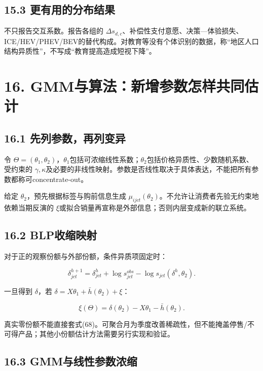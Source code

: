 \documentclass[
  11pt,
]{article}
\begin{document}
\subsection{15.3
更有用的分布结果}\label{ux66f4ux6709ux7528ux7684ux5206ux5e03ux7ed3ux679c}

不只报告交互系数。报告各组的
\(\Delta s_{d,c}\)、补偿性支付意愿、决策---体验损失、ICE/HEV/PHEV/BEV的替代构成。对教育等没有个体识别的数据，称``地区人口结构异质性''，不写成``教育提高造成短视下降''。

\section{16.
GMM与算法：新增参数怎样共同估计}\label{gmmux4e0eux7b97ux6cd5ux65b0ux589eux53c2ux6570ux600eux6837ux5171ux540cux4f30ux8ba1}

\subsection{16.1
先列参数，再列变异}\label{ux5148ux5217ux53c2ux6570ux518dux5217ux53d8ux5f02}

令
\(\Theta=(\theta_1,\theta_2)\)，\(\theta_1\)包括可浓缩线性系数；\(\theta_2\)包括价格异质性、少数随机系数、受约束的
\(\gamma,\kappa\)及必要的非线性映射。参数是否线性取决于具体表达，不能把所有参数都称可concentrate-out。

给定 \(\theta_2\)，预先根据标签与购前信息生成
\(\mu_{ijct}(\theta_2)\)。不允许让消费者先验无约束地依赖当期反演的
\(\xi\)或拟合销量再宣称是外部信息；否则内层变成新的联立系统。

\subsection{16.2 BLP收缩映射}\label{blpux6536ux7f29ux6620ux5c04}

对于正的观察份额与外部份额，条件异质项固定时：

\[
\delta_{jct}^{h+1}=\delta_{jct}^{h}
+\log s_{jct}^{obs}
-\log s_{jct}(\delta^{h},\theta_2).
\tag{68}
\]

一旦得到 \(\delta\)，若 \(\delta=X\theta_1+\bar h(\theta_2)+\xi\)：

\[
\xi(\Theta)=\delta(\theta_2)-X\theta_1-\bar h(\theta_2).
\tag{69}
\]

真实零份额不能直接套式(68)。可聚合月为季度改善稀疏性，但不能掩盖停售/不可得产品；其他小份额估计方法需要另行实现和验证。

\subsection{16.3
GMM与线性参数浓缩}\label{gmmux4e0eux7ebfux6027ux53c2ux6570ux6d53ux7f29}
\end{document}
